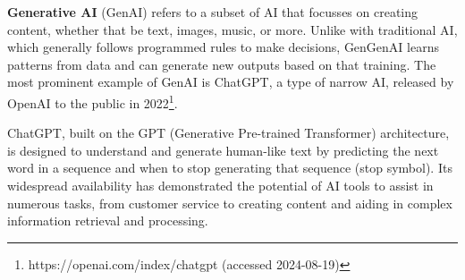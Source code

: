 \textbf{Generative AI} (GenAI) refers to a subset of AI that focusses on creating content, whether that be text, images, music, or more. Unlike with traditional AI, which generally follows programmed rules to make decisions, GenGenAI learns patterns from data and can generate new outputs based on that training. The most prominent example of GenAI is ChatGPT, a type of narrow AI, released by OpenAI to the public in 2022\footnote{https://openai.com/index/chatgpt (accessed 2024-08-19)}.

ChatGPT, built on the GPT (Generative Pre-trained Transformer) architecture, is designed to understand and generate human-like text by predicting the next word in a sequence and when to stop generating that sequence (stop symbol). Its widespread availability has demonstrated the potential of AI tools to assist in numerous tasks, from customer service to creating content and aiding in complex information retrieval and processing.
